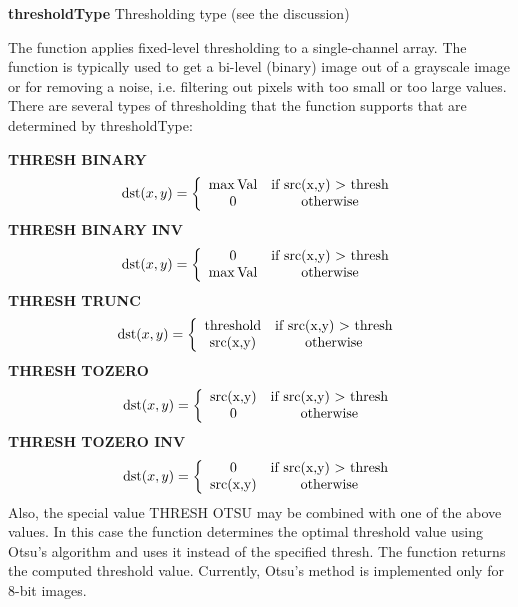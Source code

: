 \documentclass{article}
\begin{document}
\textbf{thresholdType }Thresholding type (see the discussion)

The function applies fixed-level thresholding to a single-channel array. The
function is typically used to get a bi-level (binary) image out of a
grayscale image or for removing a noise, i.e. filtering out pixels with too
small or too large values. There are several types of thresholding that the
function supports that are determined by thresholdType:

\textbf{THRESH BINARY}
\[
\mbox{dst}(x,y)=\left\{ {{\begin{array}{*{20}c}
 {\max \mbox{Val}} & {\mbox{if src(x,y) > thresh}} \\
 0 & {\mbox{otherwise}} \\
\end{array} }} \right.
\]
\textbf{THRESH BINARY INV}
\[
\mbox{dst}(x,y)=\left\{ {{\begin{array}{*{20}c}
 0 & {\mbox{if src(x,y) > thresh}} \\
 {\max \mbox{Val}} & {\mbox{otherwise}} \\
\end{array} }} \right.
\]
\textbf{THRESH TRUNC}
\[
\mbox{dst}(x,y)=\left\{ {{\begin{array}{*{20}c}
 {\mbox{threshold}} & {\mbox{if src(x,y) > thresh}} \\
 {\mbox{src(x,y)}} & {\mbox{otherwise}} \\
\end{array} }} \right.
\]
\textbf{THRESH TOZERO}
\[
\mbox{dst}(x,y)=\left\{ {{\begin{array}{*{20}c}
 {\mbox{src(x,y)}} & {\mbox{if src(x,y) > thresh}} \\
 0 & {\mbox{otherwise}} \\
\end{array} }} \right.
\]
\textbf{THRESH TOZERO INV}
\[
\mbox{dst}(x,y)=\left\{ {{\begin{array}{*{20}c}
 \mbox{0} & {\mbox{if src(x,y) > thresh}} \\
 {\mbox{src(x,y)}} & {\mbox{otherwise}} \\
\end{array} }} \right.
\]
Also, the special value THRESH OTSU may be combined with one of the above
values. In this case the function determines the optimal threshold value
using Otsu's algorithm and uses it instead of the specified thresh. The
function returns the computed threshold value. Currently, Otsu's method is
implemented only for 8-bit images.
\end{document}
